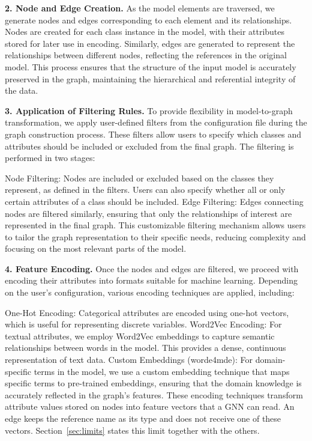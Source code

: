 \documentclass[journal,article,submit,moreauthors,technologies]{Definitions/mdpi}
\newcommand{\rev}[1]{#1}
\begin{document}
\textbf{2. Node and Edge Creation.}
As the model elements are traversed, we generate nodes and edges corresponding to each element and its relationships. Nodes are created for each class instance in the model, with their attributes stored for later use in encoding. Similarly, edges are generated to represent the relationships between different nodes, reflecting the references in the original model. This process ensures that the structure of the input model is accurately preserved in the graph, maintaining the hierarchical and referential integrity of the data.

\textbf{3. Application of Filtering Rules.}
To provide flexibility in model-to-graph transformation, we apply user-defined filters from the configuration file during the graph construction process. These filters allow users to specify which classes and attributes should be included or excluded from the final graph. The filtering is performed in two stages:

Node Filtering: Nodes are included or excluded based on the classes they represent, as defined in the filters. Users can also specify whether all or only certain attributes of a class should be included.
Edge Filtering: Edges connecting nodes are filtered similarly, ensuring that only the relationships of interest are represented in the final graph.
This customizable filtering mechanism allows users to tailor the graph representation to their specific needs, reducing complexity and focusing on the most relevant parts of the model.

\textbf{4. Feature Encoding.}
Once the nodes and edges are filtered, we proceed with encoding their attributes into formats suitable for machine learning. Depending on the user's configuration, various encoding techniques are applied, including:

One-Hot Encoding: Categorical attributes are encoded using one-hot vectors, which is useful for representing discrete variables.
Word2Vec Encoding: For textual attributes, we employ Word2Vec embeddings to capture semantic relationships between words in the model. This provides a dense, continuous representation of text data.
Custom Embeddings (worde4mde): For domain-specific terms in the model, we use a custom embedding technique that maps specific terms to pre-trained embeddings, ensuring that the domain knowledge is accurately reflected in the graph's features.
\rev{These encoding techniques transform attribute values stored on nodes into feature vectors that a GNN can read. An edge keeps the reference name as its type and does not receive one of these vectors. Section~\ref{sec:limits} states this limit together with the others.}
\end{document}
